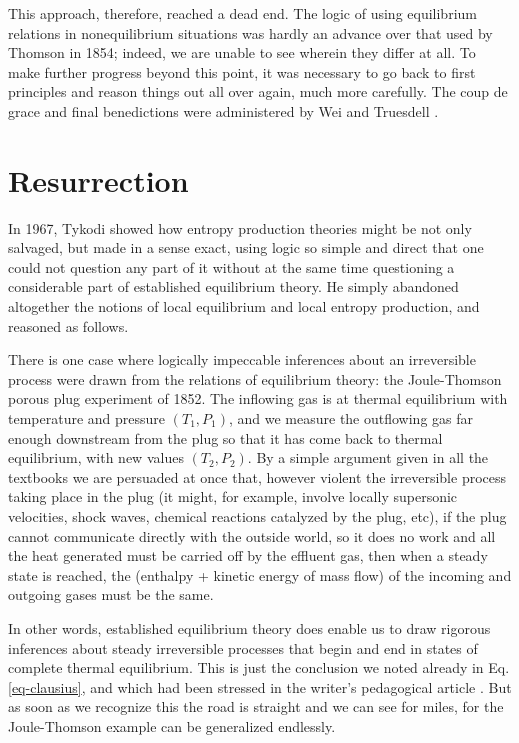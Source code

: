 \documentclass{article}
\begin{document}
This approach, therefore, reached a dead end. The logic of using equilibrium relations in nonequilibrium situations was hardly an advance over that used by Thomson in 1854; indeed, we are unable to see wherein they differ at all. To make further progress beyond this point, it was necessary to go back to first principles and reason things out all over again, much more carefully. The coup de grace and final benedictions were administered by Wei \cite{wei1966} and Truesdell \cite{truesdell1969}.

\section{Resurrection}

In 1967, Tykodi \cite{tykodi1967} showed how entropy production theories might be not only salvaged, but made in a sense exact, using logic so simple and direct that one could not question any part of it without at the same time questioning a considerable part of established equilibrium theory. He simply abandoned altogether the notions of local equilibrium and local entropy production, and reasoned as follows.

There is one case where logically impeccable inferences about an irreversible process were drawn from the relations of equilibrium theory: the Joule-Thomson porous plug experiment of 1852. The inflowing gas is at thermal equilibrium with temperature and pressure $\left(T_1, P_1\right)$, and we measure the outflowing gas far enough downstream from the plug so that it has come back to thermal equilibrium, with new values $\left(T_2, P_2\right)$. By a simple argument given in all the textbooks we are persuaded at once that, however violent the irreversible process taking place in the plug (it might, for example, involve locally supersonic velocities, shock waves, chemical reactions catalyzed by the plug, etc), if the plug cannot communicate directly with the outside world, so it does no work and all the heat generated must be carried off by the effluent gas, then when a steady state is reached, the (enthalpy + kinetic energy of mass flow) of the incoming and outgoing gases must be the same.

In other words, established equilibrium theory does enable us to draw rigorous inferences about steady irreversible processes that begin and end in states of complete thermal equilibrium. This is just the conclusion we noted already in Eq. \ref{eq-clausius}, and which had been stressed in the writer's pedagogical article \cite{jaynes1965}. But as soon as we recognize this the road is straight and we can see for miles, for the Joule-Thomson example can be generalized endlessly.
\end{document}
